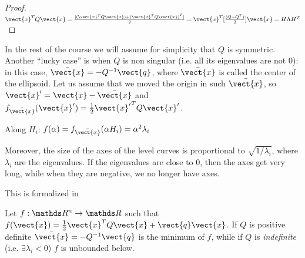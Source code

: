 \documentclass[computationalMathematics.tex]{subfiles}
\begin{document}
\begin{proof}
$\vect{x}^T Q \vect{x} = \frac{[(\vect{x}^T Q \vect{x}) + {(\vect{x}^T Q \vect{x})}^T]}{2} = \vect{x}^T [\frac{(Q + Q^T )}{2}] \vect{x} = H \Lambda H^T$
\end{proof}

\noindent In the rest of the course we will assume for simplicity that $Q$ is symmetric.
Another ``lucky case'' is when $Q$ is non singular (i.e. all its eigenvalues are not $0$): in this case,  $\bar{\vect{x}} = - \inv{Q} \vect{q}$, where $\bar{\vect{x}}$ is called the center of the ellipsoid.
Let us assume that we moved the origin in such $\bar{\vect{x}}$, so $\vect{x}' = \vect{x} - \bar{\vect{x}}$ and $f_{\bar{\vect{x}}}(\vect{x}') = \frac{1}{2} \tr{\vect{x}'} Q \vect{x}'$.

\begin{proposition}
Along $H_i$: $f(\alpha) = f_{\bar{\vect{x}}}( \alpha H_i ) = \alpha^2 \lambda_i$
\end{proposition}

\noindent Moreover, the size of the axes of the level curves is proportional to $\sqrt{1 / \lambda_i}$, where $\lambda_i$ are the eigenvalues.
If the eigenvalues are close to $0$, then the axes get very long, while when they are negative, we no longer have axes.

This is formalized in

\begin{proposition}
	Let $f:\R^n \to \R$ such that $f(\vect{x}) = \frac{1}{2} \tr{\vect{x}} Q \vect{x} + \vect{q} \vect{x}$.
	If $Q$ is positive definite $\bar{\vect{x}} = - \inv{Q} \vect{q}$ is the minimum of $f$, while if $Q$ is \emph{indefinite} (i.e. $\exists \lambda_i <0$) $f$ is unbounded below.
\end{proposition}
\end{document}
